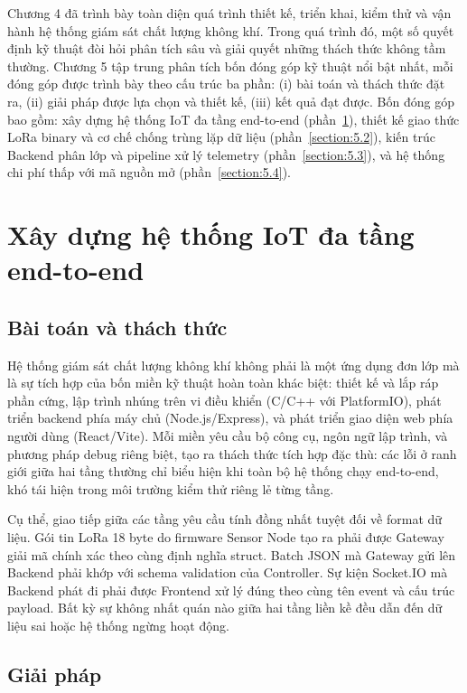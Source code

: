 \documentclass[../DoAn.tex]{subfiles}
\begin{document}
Chương 4 đã trình bày toàn diện quá trình thiết kế, triển khai, kiểm thử và vận hành hệ thống giám sát chất lượng không khí. Trong quá trình đó, một số quyết định kỹ thuật đòi hỏi phân tích sâu và giải quyết những thách thức không tầm thường. Chương 5 tập trung phân tích bốn đóng góp kỹ thuật nổi bật nhất, mỗi đóng góp được trình bày theo cấu trúc ba phần: (i) bài toán và thách thức đặt ra, (ii) giải pháp được lựa chọn và thiết kế, (iii) kết quả đạt được. Bốn đóng góp bao gồm: xây dựng hệ thống \gls{IoT} đa tầng end-to-end (phần~\ref{section:5.1}), thiết kế giao thức \gls{LoRa} binary và cơ chế chống trùng lặp dữ liệu (phần~\ref{section:5.2}), kiến trúc Backend phân lớp và pipeline xử lý telemetry (phần~\ref{section:5.3}), và hệ thống chi phí thấp với mã nguồn mở (phần~\ref{section:5.4}).

\section{Xây dựng hệ thống IoT đa tầng end-to-end}
\label{section:5.1}

\subsection{Bài toán và thách thức}
\label{subsection:5.1.1}

Hệ thống giám sát chất lượng không khí không phải là một ứng dụng đơn lớp mà là sự tích hợp của bốn miền kỹ thuật hoàn toàn khác biệt: thiết kế và lắp ráp phần cứng, lập trình nhúng trên vi điều khiển (C/C++ với PlatformIO), phát triển backend phía máy chủ (Node.js/Express), và phát triển giao diện web phía người dùng (React/Vite). Mỗi miền yêu cầu bộ công cụ, ngôn ngữ lập trình, và phương pháp debug riêng biệt, tạo ra thách thức tích hợp đặc thù: các lỗi ở ranh giới giữa hai tầng thường chỉ biểu hiện khi toàn bộ hệ thống chạy end-to-end, khó tái hiện trong môi trường kiểm thử riêng lẻ từng tầng.

Cụ thể, giao tiếp giữa các tầng yêu cầu tính đồng nhất tuyệt đối về format dữ liệu. Gói tin \gls{LoRa} 18 byte do firmware Sensor Node tạo ra phải được Gateway giải mã chính xác theo cùng định nghĩa struct. Batch \gls{JSON} mà Gateway gửi lên Backend phải khớp với schema validation của Controller. Sự kiện Socket.IO mà Backend phát đi phải được Frontend xử lý đúng theo cùng tên event và cấu trúc payload. Bất kỳ sự không nhất quán nào giữa hai tầng liền kề đều dẫn đến dữ liệu sai hoặc hệ thống ngừng hoạt động.

\subsection{Giải pháp}
\label{subsection:5.1.2}
\end{document}
